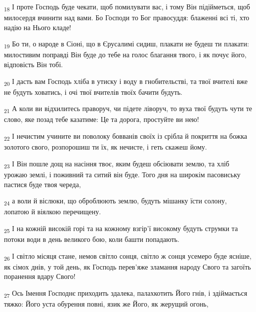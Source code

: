 \begin{tcolorbox}
\textsubscript{18} І проте Господь буде чекати, щоб помилувати вас, і тому Він підійметься, щоб милосердя вчинити над вами. Бо Господи то Бог правосуддя: блаженні всі ті, хто надію на Нього кладе!
\end{tcolorbox}
\begin{tcolorbox}
\textsubscript{19} Бо ти, о народе в Сіоні, що в Єрусалимі сидиш, плакати не будеш ти плакати: милостивим поправді Він буде до тебе на голос благання твого, і як почує його, відповість Він тобі.
\end{tcolorbox}
\begin{tcolorbox}
\textsubscript{20} І дасть вам Господь хліба в утиску і воду в гнобительстві, та твої вчителі вже не будуть ховатись, і очі твої вчителів твоїх бачити будуть.
\end{tcolorbox}
\begin{tcolorbox}
\textsubscript{21} А коли ви відхилитесь праворуч, чи підете ліворуч, то вуха твої будуть чути те слово, яке позад тебе казатиме: Це та дорога, простуйте ви нею!
\end{tcolorbox}
\begin{tcolorbox}
\textsubscript{22} І нечистим учините ви поволоку бовванів своїх із срібла й покриття на божка золотого свого, розпорошиш ти їх, як нечисте, і геть скажеш йому.
\end{tcolorbox}
\begin{tcolorbox}
\textsubscript{23} І Він пошле дощ на насіння твоє, яким будеш обсіювати землю, та хліб урожаю землі, і поживний та ситий він буде. Того дня на широкім пасовиську пастися буде твоя череда,
\end{tcolorbox}
\begin{tcolorbox}
\textsubscript{24} а воли й віслюки, що оброблюють землю, будуть мішанку їсти солону, лопатою й віялкою перечищену.
\end{tcolorbox}
\begin{tcolorbox}
\textsubscript{25} І на кожній високій горі та на кожному взгір'ї високому будуть струмки та потоки води в день великого бою, коли башти попадають.
\end{tcolorbox}
\begin{tcolorbox}
\textsubscript{26} І світло місяця стане, немов світло сонця, світло ж сонця усемеро буде ясніше, як сімох днів, у той день, як Господь перев'яже зламання народу Свого та загоїть поранення вдару Свого!
\end{tcolorbox}
\begin{tcolorbox}
\textsubscript{27} Ось Імення Господнє приходить здалека, палахкотить Його гнів, і здіймається тяжко: Його уста обурення повні, язик же Його, як жерущий огонь,
\end{tcolorbox}
